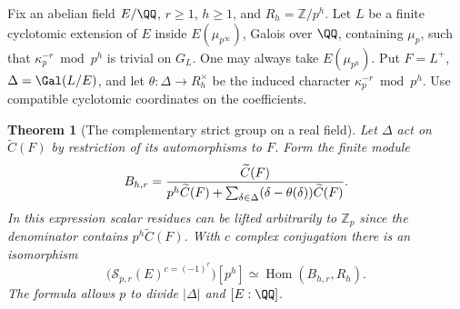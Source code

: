 \documentclass[a4paper,11pt]{article}
\newtheorem{theorem}[proposition]{Theorem}
\theoremstyle{definition}
\theoremstyle{remark}
\newcommand{\ZZ}{\mathbb Z}\newcommand{\ord}{\operatorname{ord}}
\numberwithin{equation}{section}
\begin{document}
Fix an abelian field \(E/\QQ\), \(r\ge1\), \(h\ge1\),
and \(R_h=\ZZ/p^h\). Let \(L\) be a finite cyclotomic
extension of \(E\) inside \(E(\mu_{p^\infty})\), Galois
over \(\QQ\), containing \(\mu_p\), such that
\(\kappa_p^{-r}\bmod p^h\) is trivial on \(G_L\).
One may always take \(E(\mu_{p^h})\). Put \(F=L^+\),
\(\Delta=\Gal(L/E)\), and let \(\theta:\Delta\to R_h^\times\)
be the induced character \(\kappa_p^{-r}\bmod p^h\).
Use compatible cyclotomic coordinates on the coefficients.

\begin{theorem}[The complementary strict group on a real field]\leavevmode
\label{thm:logstrict319}
Let \(\Delta\) act on \(\widetilde C(F)\) by restriction
of its automorphisms to \(F\). Form the finite module
\[
 B_{h,r}=
 {\widetilde C(F)\over
   p^h\widetilde C(F)+
     \sum_{\delta\in\Delta}(\delta-\theta(\delta))\widetilde C(F)} .
\]
In this expression scalar residues can be lifted arbitrarily
to \(\ZZ_p\) since the denominator contains \(p^h\widetilde C(F)\).
With \(c\) complex conjugation there is an isomorphism
\[
    \bigl(\mathcal S_{p,r}(E)^{c=(-1)^r}\bigr)[p^h]
             \simeq\operatorname{Hom}(B_{h,r},R_h).
\]
The formula allows \(p\) to divide \(|\Delta|\) and \([E:\QQ]\).
\end{theorem}
\end{document}
